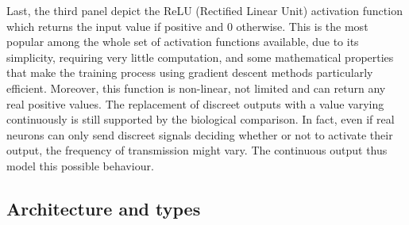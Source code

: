 \documentclass[a4paper,10pt]{report}
\begin{document}
Last, the third panel depict the ReLU (Rectified Linear Unit) activation function which returns the input value if 
positive and 0 otherwise. This is the most popular among the whole set of activation functions available, due to its simplicity, requiring very little computation, and some mathematical properties that make the training process using gradient
descent methods particularly efficient.
Moreover, this function is non-linear, not limited and can return any real positive values.
The replacement of discreet outputs with a value varying continuously is still supported by the biological comparison.
In fact, even if real neurons can only send discreet signals deciding whether or not to activate their output, 
the frequency of transmission might vary. The continuous output thus model this possible behaviour.

\subsection{Architecture and types}
\end{document}
